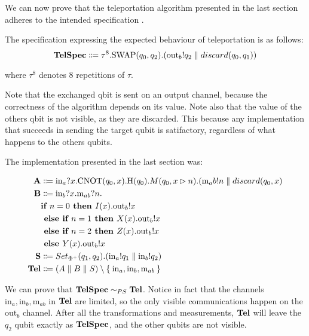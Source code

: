 \begin{example}
We can now prove that the teleportation algorithm presented in the last section adheres to the intended specification .

 The specification expressing the expected behaviour of teleportation is as follows:
\[\text{\textbf{TelSpec}} \Coloneqq \tau^8.\text{SWAP}(q_0,q_2).(\text{out}_b!q_2 \parallel discard(q_0, q_1))\]

where $\tau^8$ denotes $8$ repetitions of $\tau$.

Note that the exchanged qbit is sent on an output channel, because the  correctness of the algorithm depends on its value. Note also that the value of the others qbit is not visible, as they are discarded. This because any implementation that succeeds in sending the target qubit is satifactory, regardless of what happens to the others qubits.

The implementation presented in the last section was: 

\begin{align*}
  \text{\textbf{A}} &\Coloneqq \text{in}_a?x.\text{CNOT}(q_0, x).\text{H}(q_0).M(q_0, x \rhd n).(\text{m}_ab!n \parallel discard(q_0, x)\\
  \text{\textbf{B}} &\Coloneqq \text{in}_b?x.\text{m}_{ab}?n.
     \\ & \textbf{if } n = 0 \textbf{ then } I(x).\text{out}_b!x\\& \textbf{ else } \textbf{if } n = 1 \textbf{ then } X(x).\text{out}_b!x\\& \textbf{ else } \textbf{if } n = 2 \textbf{ then } Z(x).\text{out}_b!x\\& \textbf{ else } Y(x).\text{out}_b!x
   \\
  \text{\textbf{S}} &\Coloneqq Set_{\Phi^+}(q_1, q_2).(\text{in}_a!q_1 \parallel \text{in}_b!q_2) \\
  \text{\textbf{Tel}} &\Coloneqq (A \parallel B \parallel S) \setminus \Set{\text{in}_a, \text{in}_b, \text{m}_{ab} }
\end{align*}

We can prove that $\text{\textbf{TelSpec}} \sim_{PS} \text{\textbf{Tel}}$. Notice in fact that the channels $\text{in}_a, \text{in}_b, \text{m}_{ab}$ in $\text{\textbf{Tel}}$ are limited, so the only visible communications happen on the $\text{out}_b$ channel. After all the transformations and measurements, $\text{\textbf{Tel}}$ will leave the $q_2$ qubit exactly as $\text{\textbf{TelSpec}}$, and the other qubits are not visible.
\end{example}

